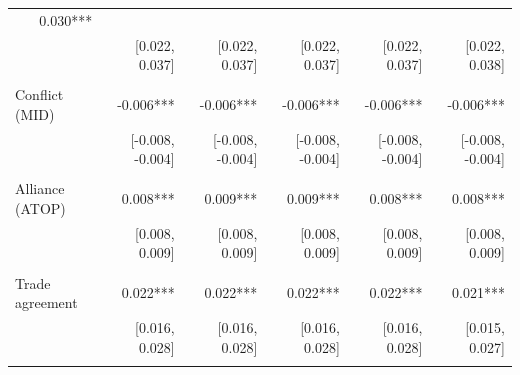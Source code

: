 \begin{table}[!h]
\begin{tabular}{llllll}
  \multicolumn{1}{r}{0.030***} \\
\multicolumn{1}{l}{} &
  \multicolumn{1}{|r}{[0.022,   0.037]} &
  \multicolumn{1}{r}{[0.022,   0.037]} &
  \multicolumn{1}{r}{[0.022,   0.037]} &
  \multicolumn{1}{r}{[0.022,   0.037]} &
  \multicolumn{1}{r}{[0.022,   0.038]} \\
\multicolumn{1}{l}{} &
  \multicolumn{1}{|r}{} &
  \multicolumn{1}{r}{} &
  \multicolumn{1}{r}{} &
  \multicolumn{1}{r}{} &
  \multicolumn{1}{r}{} \\
\multicolumn{1}{l}{Conflict (MID)} &
  \multicolumn{1}{|r}{-0.006***} &
  \multicolumn{1}{r}{-0.006***} &
  \multicolumn{1}{r}{-0.006***} &
  \multicolumn{1}{r}{-0.006***} &
  \multicolumn{1}{r}{-0.006***} \\
\multicolumn{1}{l}{} &
  \multicolumn{1}{|r}{[-0.008,  -0.004]} &
  \multicolumn{1}{r}{[-0.008,  -0.004]} &
  \multicolumn{1}{r}{[-0.008,  -0.004]} &
  \multicolumn{1}{r}{[-0.008,  -0.004]} &
  \multicolumn{1}{r}{[-0.008,  -0.004]} \\
\multicolumn{1}{l}{} &
  \multicolumn{1}{|r}{} &
  \multicolumn{1}{r}{} &
  \multicolumn{1}{r}{} &
  \multicolumn{1}{r}{} &
  \multicolumn{1}{r}{} \\
\multicolumn{1}{l}{Alliance (ATOP)} &
  \multicolumn{1}{|r}{0.008***} &
  \multicolumn{1}{r}{0.009***} &
  \multicolumn{1}{r}{0.009***} &
  \multicolumn{1}{r}{0.008***} &
  \multicolumn{1}{r}{0.008***} \\
\multicolumn{1}{l}{} &
  \multicolumn{1}{|r}{[0.008,   0.009]} &
  \multicolumn{1}{r}{[0.008,   0.009]} &
  \multicolumn{1}{r}{[0.008,   0.009]} &
  \multicolumn{1}{r}{[0.008,   0.009]} &
  \multicolumn{1}{r}{[0.008,   0.009]} \\
\multicolumn{1}{l}{} &
  \multicolumn{1}{|r}{} &
  \multicolumn{1}{r}{} &
  \multicolumn{1}{r}{} &
  \multicolumn{1}{r}{} &
  \multicolumn{1}{r}{} \\
\multicolumn{1}{l}{Trade agreement} &
  \multicolumn{1}{|r}{0.022***} &
  \multicolumn{1}{r}{0.022***} &
  \multicolumn{1}{r}{0.022***} &
  \multicolumn{1}{r}{0.022***} &
  \multicolumn{1}{r}{0.021***} \\
\multicolumn{1}{l}{} &
  \multicolumn{1}{|r}{[0.016,   0.028]} &
  \multicolumn{1}{r}{[0.016,   0.028]} &
  \multicolumn{1}{r}{[0.016,   0.028]} &
  \multicolumn{1}{r}{[0.016,   0.028]} &
  \multicolumn{1}{r}{[0.015,   0.027]} \\
\multicolumn{1}{l}{} &
  \multicolumn{1}{|r}{} &
  \multicolumn{1}{r}{} &
  \multicolumn{1}{r}{} &
  \multicolumn{1}{r}{} &
  \multicolumn{1}{r}{} \\

\end{tabular}
\end{table}
